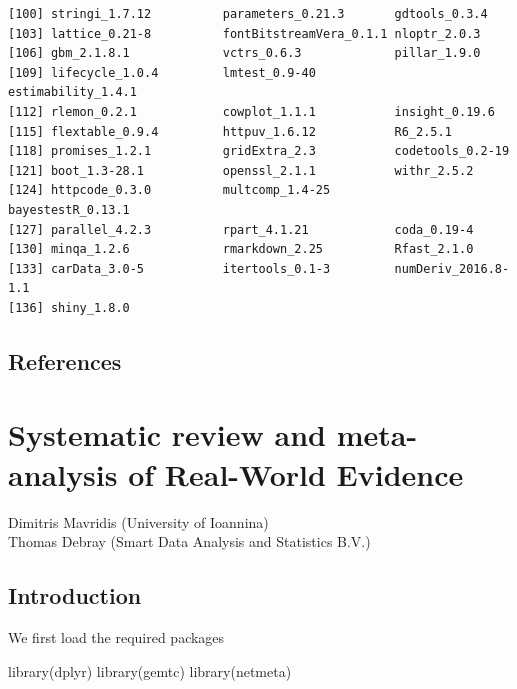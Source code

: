 \documentclass[
  letterpaper,
  DIV=11,
  numbers=noendperiod]{scrreprt}
\newenvironment{Shaded}{\begin{snugshade}}{\end{snugshade}}
\newcommand{\FunctionTok}[1]{\textcolor[rgb]{0.28,0.35,0.67}{#1}}
\newcommand{\NormalTok}[1]{\textcolor[rgb]{0.00,0.23,0.31}{#1}}
\begin{document}
\begin{verbatim}
[100] stringi_1.7.12          parameters_0.21.3       gdtools_0.3.4          
[103] lattice_0.21-8          fontBitstreamVera_0.1.1 nloptr_2.0.3           
[106] gbm_2.1.8.1             vctrs_0.6.3             pillar_1.9.0           
[109] lifecycle_1.0.4         lmtest_0.9-40           estimability_1.4.1     
[112] rlemon_0.2.1            cowplot_1.1.1           insight_0.19.6         
[115] flextable_0.9.4         httpuv_1.6.12           R6_2.5.1               
[118] promises_1.2.1          gridExtra_2.3           codetools_0.2-19       
[121] boot_1.3-28.1           openssl_2.1.1           withr_2.5.2            
[124] httpcode_0.3.0          multcomp_1.4-25         bayestestR_0.13.1      
[127] parallel_4.2.3          rpart_4.1.21            coda_0.19-4            
[130] minqa_1.2.6             rmarkdown_2.25          Rfast_2.1.0            
[133] carData_3.0-5           itertools_0.1-3         numDeriv_2016.8-1.1    
[136] shiny_1.8.0            
\end{verbatim}

\hypertarget{references-2}{%
\section*{References}\label{references-2}}



\hypertarget{systematic-review-and-meta-analysis-of-real-world-evidence}{%
\chapter{Systematic review and meta-analysis of Real-World
Evidence}\label{systematic-review-and-meta-analysis-of-real-world-evidence}}

Dimitris Mavridis (University of Ioannina)\\
Thomas Debray (Smart Data Analysis and Statistics B.V.)

\hfill\break

\hypertarget{introduction-1}{%
\section{Introduction}\label{introduction-1}}

We first load the required packages

\begin{Shaded}
\begin{Highlighting}[]
\FunctionTok{library}\NormalTok{(dplyr)}
\FunctionTok{library}\NormalTok{(gemtc)}
\FunctionTok{library}\NormalTok{(netmeta)}
\end{Highlighting}
\end{Shaded}
\end{document}
